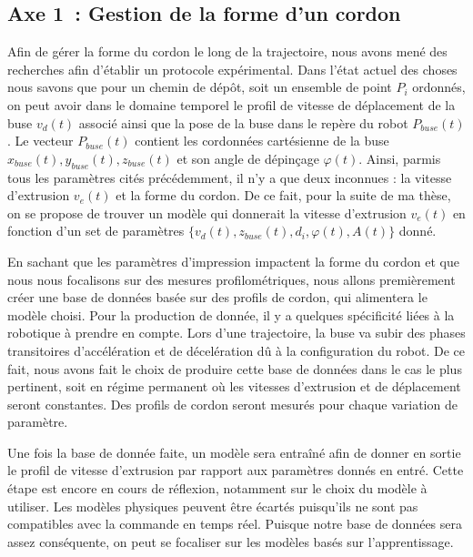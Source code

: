 \documentclass[11pt,a4paper]{article}
\begin{document}
    \subsection*{Axe 1~: Gestion de la forme d'un cordon}
        Afin de gérer la forme du cordon le long de la trajectoire, nous avons mené des recherches afin d'établir un protocole expérimental. Dans l'état actuel des choses nous savons que pour un chemin de dépôt, soit un ensemble de point $P_i$ ordonnés, on peut avoir dans le domaine temporel le profil de vitesse de déplacement de la buse $v_d(t)$ associé ainsi que la pose de la buse dans le repère du robot $P_{buse}(t)$. Le vecteur $P_{buse}(t)$ contient les cordonnées cartésienne de la buse $x_{buse}(t), y_{buse}(t), z_{buse}(t)$ et son angle de dépinçage $\varphi(t)$. Ainsi, parmis tous les paramètres cités précédemment, il n'y a que deux inconnues : la vitesse d'extrusion $v_e(t)$ et la forme du cordon. 
        De ce fait, pour la suite de ma thèse, on se propose de trouver un modèle qui donnerait la vitesse d'extrusion $v_e(t)$ en fonction d'un set de paramètres $\{v_d(t), z_{buse}(t), d_i, \varphi(t), A(t)\}$ donné. 

        En sachant que les paramètres d'impression impactent la forme du cordon et que nous nous focalisons sur des mesures profilométriques, nous allons premièrement créer une base de données basée sur des profils de cordon, qui alimentera le modèle choisi. 
        Pour la production de donnée, il y a quelques spécificité liées à la robotique à prendre en compte. Lors d'une trajectoire, la buse va subir des phases transitoires d'accélération et de décelération dû à la configuration du robot. De ce fait, nous avons fait le choix de produire cette base de données dans le cas le plus pertinent, soit en régime permanent où les vitesses d'extrusion et de déplacement seront constantes. Des profils de cordon seront mesurés pour chaque variation de paramètre. 

        Une fois la base de donnée faite, un modèle sera entraîné afin de donner en sortie le profil de vitesse d'extrusion par rapport aux paramètres donnés en entré. Cette étape est encore en cours de réflexion, notamment sur le choix du modèle à utiliser. Les modèles physiques peuvent être écartés puisqu'ils ne sont pas compatibles avec la commande en temps réel. Puisque notre base de données sera assez conséquente, on peut se focaliser sur les modèles basés sur l'apprentissage. 
\end{document}
